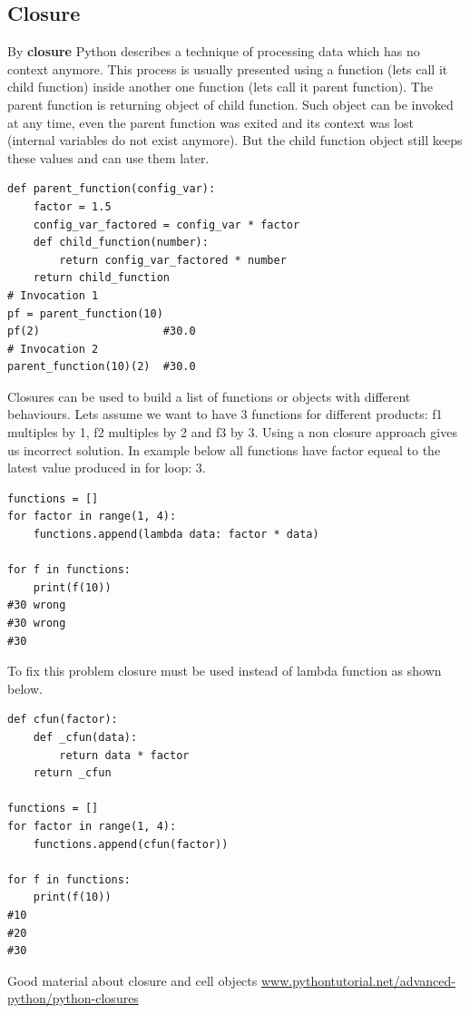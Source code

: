 \documentclass{article}
\begin{document}
\subsection{Closure}
By \textbf{closure} Python describes a technique of processing data which has no context anymore. This process is usually presented using a function (lets call it child function) inside another one function (lets call it parent function). The parent function is returning object of child function. Such object can be invoked at any time, even the parent function was exited and its context was lost (internal variables do not exist anymore). But the child function object still keeps these values and can use them later.
\begin{lstlisting}[style=pystyle]
def parent_function(config_var):
    factor = 1.5
    config_var_factored = config_var * factor
    def child_function(number):
        return config_var_factored * number
    return child_function
# Invocation 1
pf = parent_function(10)
pf(2)					#30.0
# Invocation 2
parent_function(10)(2)	#30.0
\end{lstlisting}

Closures can be used to build a list of functions or objects with different behaviours. Lets assume we want to have 3 functions for different products: f1 multiples by 1, f2 multiples by 2 and f3 by 3. Using a non closure approach gives us incorrect solution. In example below all functions have factor equeal to the latest value produced in for loop: 3.
\begin{lstlisting}[style=pystyle]
functions = []
for factor in range(1, 4):
    functions.append(lambda data: factor * data)
    
for f in functions:
    print(f(10))
#30 wrong
#30 wrong
#30
\end{lstlisting}

To fix this problem closure must be used instead of lambda function as shown below.
\begin{lstlisting}[style=pystyle]
def cfun(factor):
    def _cfun(data):
        return data * factor
    return _cfun
 
functions = []   
for factor in range(1, 4):
    functions.append(cfun(factor))

for f in functions:
    print(f(10))
#10
#20
#30
\end{lstlisting}

Good material about closure and cell objects \href{https://www.pythontutorial.net/advanced-python/python-closures/}{www.pythontutorial.net/advanced-python/python-closures}
\end{document}

